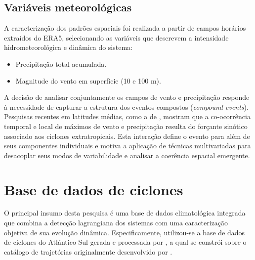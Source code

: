 \subsection{Variáveis meteorológicas}\label{subsec:variables}

A caracterização dos padrões espaciais foi realizada a partir de campos horários extraídos do ERA5, selecionando as variáveis que descrevem a intensidade hidrometeorológica e dinâmica do sistema:
\begin{itemize}
    \item Precipitação total acumulada.
    \item Magnitude do vento em superfície (10 e 100 m).
\end{itemize}
A decisão de analisar conjuntamente os campos de vento e precipitação responde à necessidade de capturar a estrutura dos eventos compostos (\textit{compound events}). Pesquisas recentes em latitudes médias, como a de \citet{chen2025characteristics}, mostram que a co-ocorrência temporal e local de máximos de vento e precipitação resulta do forçante sinótico associado aos ciclones extratropicais. Esta interação define o evento para além de seus componentes individuais e motiva a aplicação de técnicas multivariadas para desacoplar seus modos de variabilidade e analisar a coerência espacial emergente.


\section{Base de dados de ciclones}\label{sec:bd_ciclones_fases}
O principal insumo desta pesquisa é uma base de dados climatológica integrada que combina a detecção lagrangiana dos sistemas com uma caracterização objetiva de sua evolução dinâmica. Especificamente, utilizou-se a base de dados de ciclones do Atlântico Sul gerada e processada por \citet{coutodesouza2024new}, a qual se constrói sobre o catálogo de trajetórias originalmente desenvolvido por \citet{gramcianinov2019properties}.

